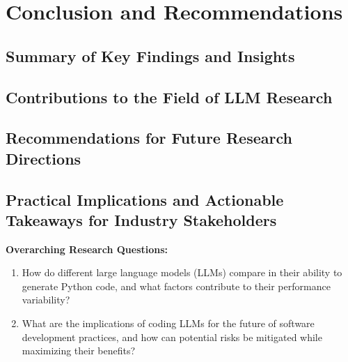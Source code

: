 
\chapter{Conclusion and Recommendations}
\label{chap:conclusion}
\pagestyle{fancy}

\section{Summary of Key Findings and Insights}

\section{Contributions to the Field of LLM Research}

\section{Recommendations for Future Research Directions}

\section{Practical Implications and Actionable Takeaways for Industry Stakeholders}

\textbf{Overarching Research Questions:}
\begin{enumerate}
    \item How do different large language models (LLMs) compare in their ability to generate Python code, and what factors contribute to their performance variability?
    \item What are the implications of coding LLMs for the future of software development practices, and how can potential risks be mitigated while maximizing their benefits?
\end{enumerate}
